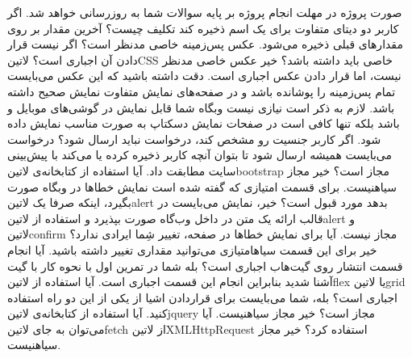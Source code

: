 \documentclass[../main.tex]{subfiles}
\begin{document}

صورت پروژه در مهلت انجام پروژه بر پایه سوالات شما به روزرسانی خواهد شد.
 اگر کاربر دو دیتای متفاوت برای یک اسم ذخیره کند تکلیف چیست؟
 آخرین مقدار بر روی مقدارهای قبلی ذخیره می‌شود.
 عکس پس‌زمینه خاصی مدنظر است؟ اگر نیست قرار دادن آن اجباری است؟ ‌لاتین{CSS} خاصی باید داشته باشد؟
 خیر عکس خاصی مدنظر نیست، اما قرار دادن عکس اجباری است. دقت داشته باشید که این عکس می‌بایست تمام پس‌زمینه را پوشانده باشد و در صفحه‌های نمایش متفاوت نمایش صحیح داشته باشد. لازم به ذکر است نیازی نیست وبگاه شما قابل نمایش در گوشی‌های موبایل و  باشد بلکه تنها کافی است در صفحات نمایش دسکتاپ به صورت مناسب نمایش داده شود.
 اگر کاربر جنسیت رو مشخص کند، درخواست نباید ارسال شود؟
 درخواست می‌بایست همیشه ارسال شود تا بتوان آنچه کاربر ذخیره کرده یا می‌کند با پیش‌بینی سایت مطابقت داد.
 آیا استفاده از کتابخانه‌ی ‌لاتین{bootstrap} مجاز است؟
 خیر مجاز ‌سیاه{نیست}.
 برای قسمت امتیازی که گفته شده است نمایش خطاها در وبگاه صورت بگیرد، اینکه صرفا یک ‌لاتین{alert} بدهد مورد قبول است؟
 خیر، نمایش می‌بایست در قالب ارائه یک متن در داخل وب‌گاه صورت بپذیرد و استفاده از ‌لاتین{alert} و ‌لاتین{confirm} مجاز نیست.
 آیا برای نمایش خطاها در صفحه، تغییر شِما ایرادی ندارد؟
 خیر برای این قسمت ‌سیاه{امتیازی} می‌توانید مقداری تغییر داشته باشید.
 آیا انجام قسمت انتشار روی گیت‌هاب اجباری است؟
 بله شما در تمرین اول با نحوه کار با گیت آشنا شدید بنابراین انجام این قسمت اجباری است.
 آیا استفاده از ‌لاتین{flex} یا ‌لاتین{grid} اجباری است؟
 بله، شما می‌بایست برای قراردادن اشیا از یکی از این دو راه استفاده کنید.
 آیا استفاده از کتابخانه‌ی ‌لاتین{jquery} مجاز است؟
 خیر مجاز ‌سیاه{نیست}.
 آیا می‌توان به جای ‌لاتین{fetch} از ‌لاتین{XMLHttpRequest} استفاده کرد؟
 خیر مجاز ‌سیاه{نیست}.
\end{document}
